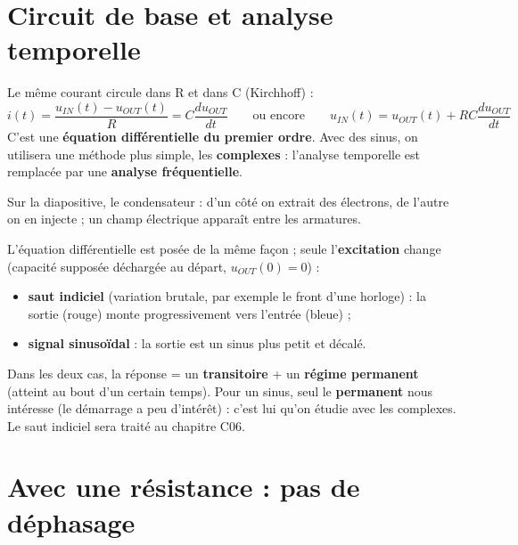 \section{Circuit de base et analyse temporelle}


\begin{thmbox}[title=Circuit RC : équation temporelle]
Le même courant circule dans R et dans C (Kirchhoff) :
\[ i(t) = \frac{u_{IN}(t) - u_{OUT}(t)}{R} = C\frac{du_{OUT}}{dt}
   \qquad\text{ou encore}\qquad u_{IN}(t) = u_{OUT}(t) + RC\frac{du_{OUT}}{dt} \]
C'est une \textbf{équation différentielle du premier ordre}. Avec des sinus, on utilisera
une méthode plus simple, les \textbf{complexes} : l'analyse temporelle est remplacée par une
\textbf{analyse fréquentielle}.
\end{thmbox}

Sur la diapositive, le condensateur : d'un côté on extrait des électrons, de l'autre on en
injecte ; un champ électrique apparaît entre les armatures.


\begin{propbox}[title=Deux types de signaux]
L'équation différentielle est posée de la même façon ; seule l'\textbf{excitation} change
(capacité supposée déchargée au départ, $u_{OUT}(0) = 0$) :
\begin{itemize}
  \item \textbf{saut indiciel} (variation brutale, par exemple le front d'une horloge) : la
        sortie (rouge) monte progressivement vers l'entrée (bleue) ;
  \item \textbf{signal sinusoïdal} : la sortie est un sinus plus petit et décalé.
\end{itemize}
Dans les deux cas, la réponse = un \textbf{transitoire} + un \textbf{régime permanent}
(atteint au bout d'un \og certain\fg{} temps). Pour un sinus, seul le
\textbf{permanent} nous intéresse (le démarrage a peu d'intérêt) : c'est lui qu'on étudie
avec les complexes. Le saut indiciel sera traité au chapitre C06.
\end{propbox}

\section{Avec une résistance : pas de déphasage}

